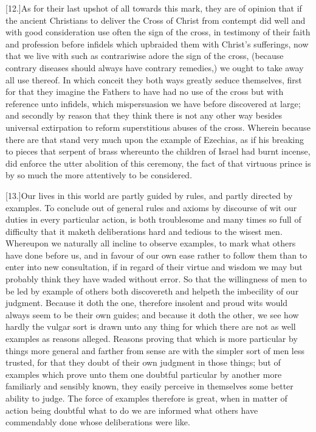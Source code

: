 [12.]As for their last upshot of all towards this mark, they are of opinion that if the ancient Christians to deliver the Cross of Christ from contempt did well and with good consideration use often the sign of the cross, in testimony of their faith and profession before infidels which upbraided them with Christ’s sufferings, now that we live with such as contrariwise adore the sign of the cross, (because contrary diseases should always have contrary remedies,) we ought to take away all use thereof. In which conceit they both ways greatly seduce themselves, first for that they imagine the Fathers to have had no use of the cross but with reference unto infidels, which mispersuasion we have before discovered at large; and secondly by reason that they think there is not any other way besides universal extirpation to reform superstitious abuses of the cross. Wherein because there are that stand very much upon the example of Ezechias, as if his breaking to pieces that serpent of brass whereunto the children of Israel had burnt incense, did enforce the utter abolition of this ceremony, the fact of that virtuous prince is by so much the more attentively to be considered.

[13.]Our lives in this world are partly guided by rules,  and partly directed by examples.
 To conclude out of general rules and axioms by discourse of wit our duties in every particular action, is both troublesome and many times so full of difficulty that it maketh deliberations hard and tedious to the wisest men. Whereupon we naturally all incline to observe examples, to mark what others have done before us, and in favour of our own ease rather to follow them than to enter into new consultation, if in regard of their virtue and wisdom we may but probably think they have waded without error. So that the willingness of men to be led by example of others both discovereth and helpeth the imbecility of our judgment. Because it doth the one, therefore insolent and proud wits would always seem to be their own guides; and because it doth the other, we see how hardly the vulgar sort is drawn unto any thing for which there are not as well examples as reasons alleged. Reasons proving that which is more particular by things more general and farther from sense are with the simpler sort of men less trusted, for that they doubt of their own judgment in those things; but of examples which prove unto them one doubtful particular by another more familiarly and sensibly known, they easily perceive in themselves some better ability to judge. The force of examples therefore is great, when in matter of action being doubtful what to do we are informed what others have commendably done whose deliberations were like.

